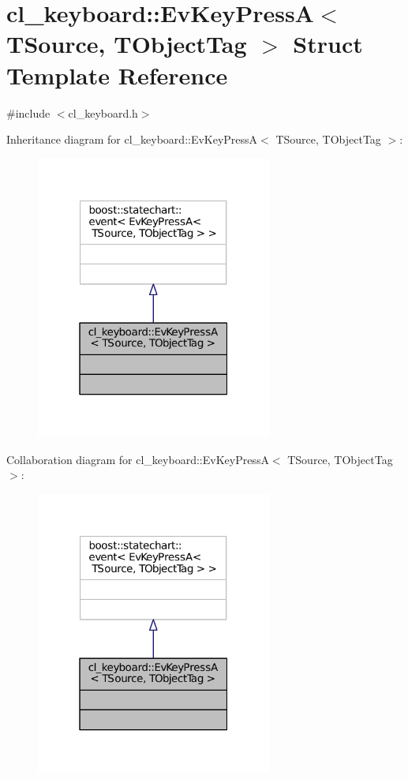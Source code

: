 \hypertarget{structcl__keyboard_1_1EvKeyPressA}{}\section{cl\+\_\+keyboard\+:\+:Ev\+Key\+PressA$<$ T\+Source, T\+Object\+Tag $>$ Struct Template Reference}
\label{structcl__keyboard_1_1EvKeyPressA}


{\ttfamily \#include $<$cl\+\_\+keyboard.\+h$>$}



Inheritance diagram for cl\+\_\+keyboard\+:\+:Ev\+Key\+PressA$<$ T\+Source, T\+Object\+Tag $>$\+:
\nopagebreak
\begin{figure}[H]
\begin{center}
\leavevmode
\includegraphics[width=220pt]{structcl__keyboard_1_1EvKeyPressA__inherit__graph}
\end{center}
\end{figure}


Collaboration diagram for cl\+\_\+keyboard\+:\+:Ev\+Key\+PressA$<$ T\+Source, T\+Object\+Tag $>$\+:
\nopagebreak
\begin{figure}[H]
\begin{center}
\leavevmode
\includegraphics[width=220pt]{structcl__keyboard_1_1EvKeyPressA__coll__graph}
\end{center}
\end{figure}


